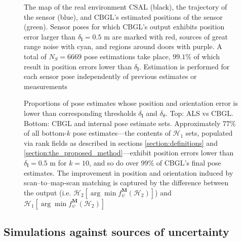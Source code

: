 \begin{figure}
  
  \vspace{-0.7cm}
  \caption{\small The map of the real environment CSAL (black), the trajectory
           of the sensor (blue), and CBGL's estimated positions of the sensor
           (green). Sensor poses for which CBGL's output exhibits position
           error larger than $\delta_{\bm{l}} = 0.5$ m are marked with red,
           sources of great range noise with cyan, and regions around doors
           with purple. A total of $N_S = 6669$ pose estimations take place,
           $99.1\%$ of which result in position errors lower than
           $\delta_{\bm{l}}$. Estimation is performed for each sensor pose
           independently of
           previous estimates or measurements}
  \vspace{-0.5cm}
  \label{fig:a:map_and_trajectory}
\end{figure}

\begin{figure}
  \vspace{-0.4cm}
  
  \vspace{0.01cm}
  \caption{\small Proportions of pose estimates whose position and orientation
           error is lower than corresponding thresholds $\delta_{\bm{l}}$ and
           $\delta_{\theta}$. Top: ALS vs CBGL. Bottom: CBGL and internal pose
           estimate sets.  Approximately $77\%$ of all bottom-$k$ pose
           estimates---the contents of $\mathcal{H}_1$ sets, populated via rank
           fields as described in sections \ref{section:definitions} and
           \ref{section:the_proposed_method}---exhibit position errors lower
           than $\delta_{\bm{l}} = 0.5$ m for $k=10$, and so do over $99\%$ of
           CBGL's final pose estimates. The improvement in position and
           orientation induced by scan--to--map-scan matching is captured by
           the difference between the output (i.e.  $\mathcal{H}_2[\arg \min
           f_{\psi}^{\bm{M}}(\mathcal{H}_2)]$) and $\mathcal{H}_1[\arg \min
           f_{\psi}^{\bm{M}}(\mathcal{H}_2)]$}
  \vspace{-0.5cm}
  \label{fig:a:awesomeness}
\end{figure}


\subsection{Simulations against sources of uncertainty}
\label{subsec:exp_b}

